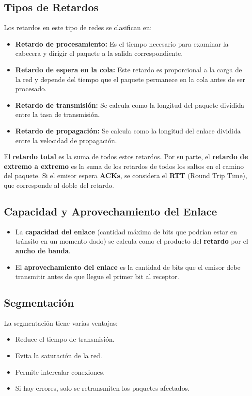 \documentclass{article}
\begin{document}
\subsection{Tipos de Retardos}
Los retardos en este tipo de redes se clasifican en:
\begin{itemize}
    \item \textbf{Retardo de procesamiento:} Es el tiempo necesario para examinar la cabecera y dirigir el paquete a la salida correspondiente.
    \item \textbf{Retardo de espera en la cola:} Este retardo es proporcional a la carga de la red y depende del tiempo que el paquete permanece en la cola antes de ser procesado.
    \item \textbf{Retardo de transmisión:} Se calcula como la longitud del paquete dividida entre la tasa de transmisión.
    \item \textbf{Retardo de propagación:} Se calcula como la longitud del enlace dividida entre la velocidad de propagación.
\end{itemize}

El \textbf{retardo total} es la suma de todos estos retardos. Por su parte, el \textbf{retardo de extremo a extremo} es la suma de los retardos de todos los saltos en el camino del paquete. Si el emisor espera \textbf{ACKs}, se considera el \textbf{RTT} (Round Trip Time), que corresponde al doble del retardo.

\subsection{Capacidad y Aprovechamiento del Enlace}
\begin{itemize}
    \item La \textbf{capacidad del enlace} (cantidad máxima de bits que podrían estar en tránsito en un momento dado) se calcula como el producto del \textbf{retardo} por el \textbf{ancho de banda}.
    \item El \textbf{aprovechamiento del enlace} es la cantidad de bits que el emisor debe transmitir antes de que llegue el primer bit al receptor.
\end{itemize}

\subsection{Segmentación}
La segmentación tiene varias ventajas:
\begin{itemize}
    \item Reduce el tiempo de transmisión.
    \item Evita la saturación de la red.
    \item Permite intercalar conexiones.
    \item Si hay errores, solo se retransmiten los paquetes afectados.
\end{itemize}
\end{document}
